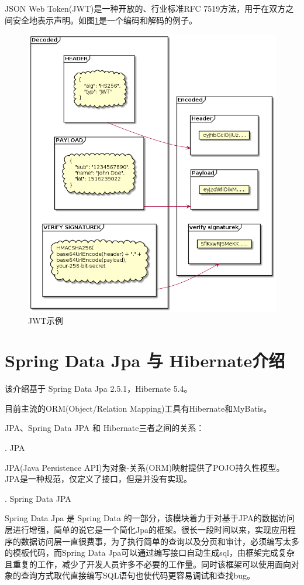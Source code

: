 JSON Web Token(JWT)是一种开放的、行业标准RFC 7519方法，用于在双方之间安全地表示声明。如图\ref{jwt}是一个编码和解码的例子。
\begin{figure}[htbp]
  \centering
  \includegraphics[scale = 0.6]{out/uml/部署图/JWT/JWT.png}
  \caption{\song\wuhao JWT示例}
  \label{jwt}
\end{figure}

\section{Spring Data Jpa 与 Hibernate介绍}

该介绍基于 Spring Data Jpa 2.5.1，Hibernate 5.4。

目前主流的ORM(Object/Relation Mapping)工具有Hibernate和MyBatis。

\noindent JPA、Spring Data JPA 和 Hibernate三者之间的关系：

. JPA

JPA(Java Persistence API)为对象-关系(ORM)映射提供了POJO持久性模型。JPA是一种规范，仅定义了接口，但是并没有实现。

. Spring Data JPA

Spring Data Jpa 是 Spring Data 的一部分，该模块着力于对基于JPA的数据访问层进行增强，简单的说它是一个简化Jpa的框架。很长一段时间以来，实现应用程序的数据访问层一直很费事，为了执行简单的查询以及分页和审计，必须编写太多的模板代码，而Spring Data Jpa可以通过编写接口自动生成sql，由框架完成复杂且重复的工作，减少了开发人员许多不必要的工作量。同时该框架可以使用面向对象的查询方式取代直接编写SQL语句也使代码更容易调试和查找bug。

